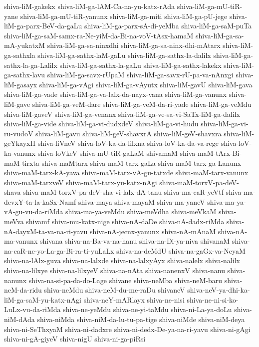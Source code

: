 {shiva-liM-gakekx
shiva-liM-ga-lAM-Ca-na-yu-katx-rAda
shiva-liM-ga-mU-tiR-yane
shiva-liM-ga-mU-tiR-yanunx
shiva-liM-ga-miti
shiva-liM-ga-pU-jege
shiva-liM-ga-parx-BeV-da-gaLu
shiva-liM-ga-parx-sA-di-yeMba
shiva-liM-ga-saM-puTa
shiva-liM-ga-saM-samx-ra-Ne-yiM-da-Bi-na-voV-tAsx-hamaM
shiva-liM-ga-sa-mA-yukatxM
shiva-liM-ga-sa-ninxdhi
shiva-liM-ga-sa-ninx-dhi-mAtarx
shiva-liM-ga-sathxla
shiva-liM-ga-sathx-laM-gaLu
shiva-liM-ga-sathx-la-dalilx
shiva-liM-ga-sathx-la-ga-Lalilx
shiva-liM-ga-sathx-la-gaLu
shiva-liM-ga-sathx-lakekx
shiva-liM-ga-sathx-lavu
shiva-liM-ga-savx-rUpaM
shiva-liM-ga-savx-rU-pa-va-nAnxgi
shiva-liM-gasayx
shiva-liM-ga-vAgi
shiva-liM-ga-vAyutx
shiva-liM-gavU
shiva-liM-gava
shiva-liM-ga-vade
shiva-liM-ga-va-lalx-da-nayx-vana
shiva-liM-ga-vanunx
shiva-liM-gave
shiva-liM-ga-veM-dare
shiva-liM-ga-veM-da-ri-yade
shiva-liM-ga-veMdu
shiva-liM-gaveV
shiva-liM-ga-venanx
shiva-liM-ga-ve-sa-vi-SaTx-liM-ga-dalilx
shiva-liM-ga-vide
shiva-liM-ga-vi-dudxdeV
shiva-liM-ga-vi-hudu
shiva-liM-ga-vi-ru-vudoV
shiva-liM-gavu
shiva-liM-geV-shavxrA
shiva-liM-geV-shavxra
shiva-liM-geYkayxH
shiva-liVneV
shiva-loV-ka-da-lilxna
shiva-loV-ka-da-va-rege
shiva-loV-ka-vanunx
shiva-loVkeV
shiva-mU-tiR-gaLaM
shivamaM
shiva-maM-tArx-Bi-maM-tirxta
shiva-maMtarx
shiva-maM-tarx-gaLa
shiva-maM-tarx-ga-Lanunx
shiva-maM-tarx-kA-yava
shiva-maM-tarx-vA-gu-tatxde
shiva-maM-tarx-vanunx
shiva-maM-tarxveV
shiva-maM-tarx-yu-katx-nAgi
shiva-maM-torxV-pa-deV-shava
shiva-maM-torxV-pa-deV-sha-vi-lalx-dA-tanu
shiva-ma-caR-yeVtf
shiva-ma-devxY-ta-la-kaSx-Namf
shiva-maya
shiva-mayaM
shiva-ma-yaneV
shiva-ma-ya-vA-gu-vu-da-riMda
shiva-ma-ya-veMdu
shiva-meVdha
shiva-meVkaM
shiva-meVva
shivamf
shiva-mu-katx-nige
shiva-nA-daDe
shiva-nA-dadx-riMda
shiva-nA-dayxM-ta-va-na-ri-yavu
shiva-nA-jecnx-yanunx
shiva-nA-mAnaM
shiva-nA-ma-vanunx
shivana
shiva-na-Ba-va-na-hanu
shiva-na-Di-ya-niva
shivanaM
shiva-na-caR-ne-yo-La-ga-Bi-ra-ti-yuLaLx
shiva-na-deMdU
shiva-na-gaGx-va-NeyaM
shiva-na-lAlx-guva
shiva-na-lalxde
shiva-na-lalxyAyx
shiva-nalelx
shiva-nalilx
shiva-na-lilxye
shiva-na-lilxyeV
shiva-na-nAta
shiva-nanenxV
shiva-nanu
shiva-nanunx
shiva-na-si-pa-da-do-Lage
shivane
shiva-neMba
shiva-neM-baru
shiva-neM-da-ridu
shiva-neMdu
shiva-neM-du-me-raDu
shivaneV
shiva-neV-ya-dhi-ka-liM-ga-saM-yu-katx-nAgi
shiva-neY-mARlayx
shiva-ne-nisi
shiva-ne-ni-si-ko-LuLx-vu-da-riMda
shiva-ne-yeMdu
shiva-ne-yi-taMdu
shiva-ni-La-ya-doLu
shiva-niM-dAda
shiva-niMda
shiva-niM-da-lu-tu-pa-tige
shiva-niMde
shiva-niM-deya
shiva-ni-SeThxyaM
shiva-ni-dadxre
shiva-ni-dedx-De-ya-na-ri-yavu
shiva-ni-gAgi
shiva-ni-gA-giyeV
shiva-nigU
shiva-ni-ga-piRsi
}
